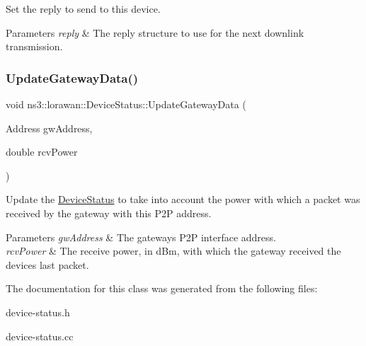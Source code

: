 Set the reply to send to this device.


\begin{DoxyParams}{Parameters}
{\em reply} & The reply structure to use for the next downlink transmission. \\
\hline
\end{DoxyParams}
\mbox{\label{classns3_1_1lorawan_1_1DeviceStatus_a76581259b5b053500387dc3e9b73094b}} 
\subsubsection{\texorpdfstring{Update\+Gateway\+Data()}{UpdateGatewayData()}}
{\footnotesize\ttfamily void ns3\+::lorawan\+::\+Device\+Status\+::\+Update\+Gateway\+Data (\begin{DoxyParamCaption}\item[{Address}]{gw\+Address,  }\item[{double}]{rcv\+Power }\end{DoxyParamCaption})}

Update the \hyperlink{classns3_1_1lorawan_1_1DeviceStatus}{Device\+Status} to take into account the power with which a packet was received by the gateway with this P2P address.


\begin{DoxyParams}{Parameters}
{\em gw\+Address} & The gateway\textquotesingle{}s P2P interface address. \\
\hline
{\em rcv\+Power} & The receive power, in d\+Bm, with which the gateway received the device\textquotesingle{}s last packet. \\
\hline
\end{DoxyParams}


The documentation for this class was generated from the following files\+:\begin{DoxyCompactItemize}
\item 
device-\/status.\+h\item 
device-\/status.\+cc\end{DoxyCompactItemize}
